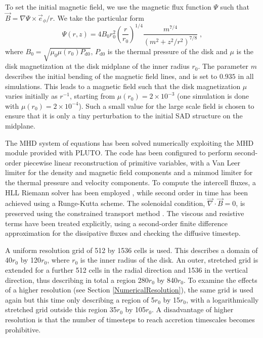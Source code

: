 \documentclass{aa}
\begin{document}
To set the initial magnetic field, we use the magnetic flux function $\Psi$ such that $\vec{B} = \nabla \Psi \times \vec e_\phi/r$. We take the particular form
\begin{equation}
\Psi (r,z) = 4 B_0 r_0^2 \left(\frac{r}{r_0}\right)^{1/4} \frac{m^{7/4}}{\left( m^2 + z^2/r^2\right)^{7/8}} \; ,
\end{equation}
where $B_0 = \sqrt{\mu_0 \mu(r_0) P_\mathrm{d0}}$, $P_\mathrm{d0}$ is the thermal pressure of the disk and $\mu$ is the disk magnetization at the disk midplane of the inner radius $r_0$. The parameter $m$ describes
the initial bending of the magnetic field lines, and is set to $0.935$ in all simulations. This leads to a magnetic field such that the disk magnetization $\mu$ varies initially as $r^{-1}$, starting
from $\mu(r_0) = 2\times 10^{-3}$ (one simulation is done with $\mu(r_0) = 2\times 10^{-4}$). Such a small value for the large scale field is chosen to ensure that it is only a tiny perturbation to
the initial SAD structure on the midplane.

The MHD system of equations has been solved numerically exploiting the MHD module provided with PLUTO. The code has been
configured to perform second-order piecewise linear reconstruction of primitive variables, with a Van Leer limiter for the density and magnetic field components 
and a minmod limiter for the thermal pressure and velocity components. To compute the intercell fluxes, a HLL Riemann solver has been employed \citep{harten:35}, 
while second order in time has been achieved using a Runge-Kutta scheme. 
The solenoidal condition, $\vec\nabla\cdot\vec B =0$, is preserved using the constrained transport method \citep{1988ApJ...332..659E}.
The viscous and resistive terms have been treated explicitly, using a second-order finite difference approximation for the dissipative fluxes and checking the 
diffusive timestep. 

A uniform resolution grid of 512 by 1536 cells is used. This describes a domain of 40$r_0$ by 120$r_0$, where $r_0$ is the inner radius of the disk. An outer, stretched grid is extended for a further
512 cells in the radial direction and 1536 in the vertical direction, thus describing in total a region 280$r_0$ by 840$r_0$.  To examine the effects of a higher resolution (see Section
\ref{NumericalResolution}), the same grid is used again but this time only describing a region of 5$r_0$ by 15$r_0$, with a logarithmically stretched grid outside this region 35$r_0$ by 105$r_0$.  A
disadvantage of higher resolution is that the number of timesteps to reach accretion timescales becomes prohibitive.
\end{document}
